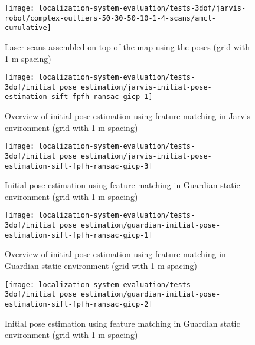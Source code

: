 \begin{figure}[H]
	\centering
	\texttt{[image: localization-system-evaluation/tests-3dof/jarvis-robot/complex-outliers-50-30-50-10-1-4-scans/amcl-cumulative]}
	\caption{Laser scans assembled on top of the map using the  poses (grid with 1 m spacing)}
	\label{fig:localization-system-evaluation_complex-path-with-outliers-50-30-50-10cm-per-sec-velocity-1-4-scans-amcl-cumulative}
\end{figure}


\begin{figure}[H]
	\centering
	\texttt{[image: localization-system-evaluation/tests-3dof/initial\_pose\_estimation/jarvis-initial-pose-estimation-sift-fpfh-ransac-gicp-1]}
	\caption{Overview of initial pose estimation using feature matching in Jarvis environment (grid with 1 m spacing)}
	\label{fig:localization-system-evaluation_jarvis-initial-pose-estimation-sift-fpfh-ransac-gicp-1}
\end{figure}

\begin{figure}[H]
	\centering
	\texttt{[image: localization-system-evaluation/tests-3dof/initial\_pose\_estimation/jarvis-initial-pose-estimation-sift-fpfh-ransac-gicp-3]}
	\caption{Initial pose estimation using feature matching in Guardian static environment (grid with 1 m spacing)}
	\label{fig:localization-system-evaluation_jarvis-initial-pose-estimation-sift-fpfh-ransac-gicp-2}
\end{figure}

\begin{figure}[H]
	\centering
	\texttt{[image: localization-system-evaluation/tests-3dof/initial\_pose\_estimation/guardian-initial-pose-estimation-sift-fpfh-ransac-gicp-1]}
	\caption{Overview of initial pose estimation using feature matching in Guardian static environment (grid with 1 m spacing)}
	\label{fig:localization-system-evaluation_ship-interior-initial-pose-estimation-sift-fpfh-ransac-gicp-1}
\end{figure}

\begin{figure}[H]
	\centering
	\texttt{[image: localization-system-evaluation/tests-3dof/initial\_pose\_estimation/guardian-initial-pose-estimation-sift-fpfh-ransac-gicp-2]}
	\caption{Initial pose estimation using feature matching in Guardian static environment (grid with 1 m spacing)}
	\label{fig:localization-system-evaluation_ship-interior-initial-pose-estimation-sift-fpfh-ransac-gicp-2}
\end{figure}




